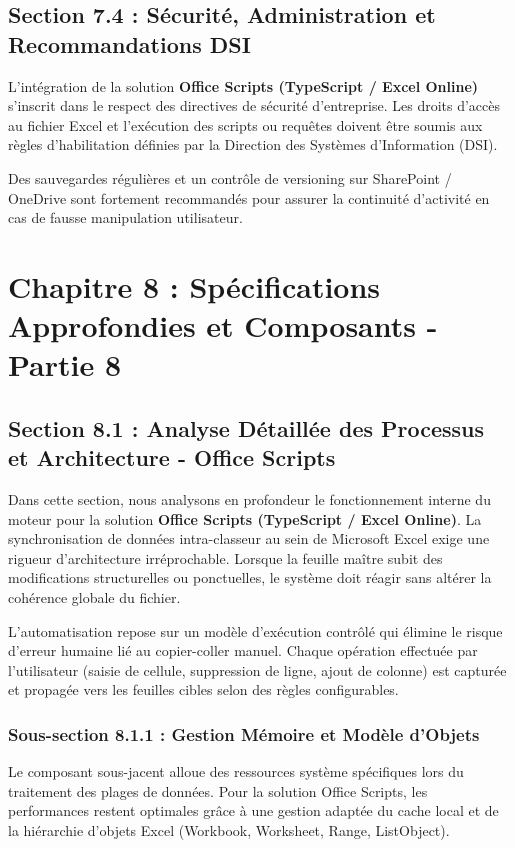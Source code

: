 \documentclass[12pt,a4paper]{report}
\begin{document}
\section{Section 7.4 : Sécurité, Administration et Recommandations DSI}
L'intégration de la solution \textbf{Office Scripts (TypeScript / Excel Online)} s'inscrit dans le respect des directives de sécurité d'entreprise. Les droits d'accès au fichier Excel et l'exécution des scripts ou requêtes doivent être soumis aux règles d'habilitation définies par la Direction des Systèmes d'Information (DSI).

Des sauvegardes régulières et un contrôle de versioning sur SharePoint / OneDrive sont fortement recommandés pour assurer la continuité d'activité en cas de fausse manipulation utilisateur.


\chapter{Chapitre 8 : Spécifications Approfondies et Composants - Partie 8}

\section{Section 8.1 : Analyse Détaillée des Processus et Architecture - Office Scripts}
Dans cette section, nous analysons en profondeur le fonctionnement interne du moteur pour la solution \textbf{Office Scripts (TypeScript / Excel Online)}. La synchronisation de données intra-classeur au sein de Microsoft Excel exige une rigueur d'architecture irréprochable. Lorsque la feuille maître subit des modifications structurelles ou ponctuelles, le système doit réagir sans altérer la cohérence globale du fichier.

L'automatisation repose sur un modèle d'exécution contrôlé qui élimine le risque d'erreur humaine lié au copier-coller manuel. Chaque opération effectuée par l'utilisateur (saisie de cellule, suppression de ligne, ajout de colonne) est capturée et propagée vers les feuilles cibles selon des règles configurables.


\subsection{Sous-section 8.1.1 : Gestion Mémoire et Modèle d'Objets}
Le composant sous-jacent alloue des ressources système spécifiques lors du traitement des plages de données. Pour la solution Office Scripts, les performances restent optimales grâce à une gestion adaptée du cache local et de la hiérarchie d'objets Excel (Workbook, Worksheet, Range, ListObject).
\end{document}
